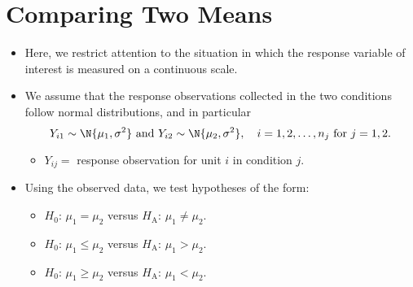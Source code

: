 \section{Comparing Two Means}
\begin{itemize}
      \item Here, we restrict attention to the situation in which the response variable
            of interest is measured on a continuous scale.
      \item We assume that the response observations collected in the two conditions follow normal
            distributions, and in particular
            \[ Y_{i1}\sim \N{\mu_1,\sigma^2}\text{ and }Y_{i2} \sim \N{\mu_2,\sigma^2},\quad i=1,2,\ldots,n_j\text{ for } j=1,2. \]
            \begin{itemize}
                  \item $ Y_{ij}= $ response observation for unit $ i $ in condition $ j $.
            \end{itemize}
      \item Using the observed data, we test hypotheses of the form:
            \begin{itemize}
                  \item $ H_0 $: $ \mu_1=\mu_2 $ versus $ H_\text{A} $: $ \mu_1\ne\mu_2 $.
                  \item $ H_0 $: $ \mu_1\le\mu_2 $ versus $ H_\text{A} $: $ \mu_1>\mu_2 $.
                  \item $ H_0 $: $ \mu_1\ge\mu_2 $ versus $ H_\text{A} $: $ \mu_1<\mu_2 $.
            \end{itemize}
\end{itemize}

